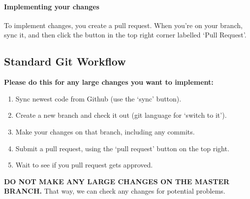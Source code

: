 \documentclass[12p,a4papert]{article}
\begin{document}
\paragraph{Implementing your changes}To implement changes, you create a pull request. When you're on your branch, sync it, and then click the button in the top right corner labelled `Pull Request'.

\subsection{Standard Git Workflow}
\textbf{Please do this for any large changes you want to implement:}
\begin{enumerate}
\item{Sync newest code from Github (use the `sync' button).}
\item{Create a new branch and check it out (git language for `switch to it').}
\item{Make your changes on that branch, including any commits.}
\item{Submit a pull request, using the `pull request' button on the top right.}
\item{Wait to see if you pull request gets approved.}
\end{enumerate}
\textbf{DO NOT MAKE ANY LARGE CHANGES ON THE MASTER BRANCH.} That way, we can check any changes for potential problems.
\end{document}
